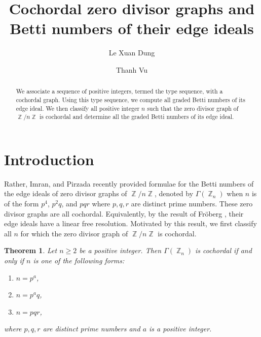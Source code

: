\documentclass[12pt,amscd]{amsart}
\newtheorem{thm}{Theorem}[section]
\theoremstyle{definition}
\numberwithin{equation}{section}
\DeclareMathOperator{\ZZ}{\mathbb {Z}}
\begin{document}
\title{Cochordal zero divisor graphs and Betti numbers of their edge ideals}


\author[L. X. Dung]{Le Xuan Dung}
\address{Department of Algebra and Geometry, Hong Duc University, No. 565 Quang Trung Street, Dong Ve Ward, Thanh Hoa, Vietnam}

\author{Thanh Vu}
\address{Institute of Mathematics, VAST, 18 Hoang Quoc Viet, Hanoi, Vietnam}




\date{}


\commby{}

\begin{abstract}
    We associate a sequence of positive integers, termed the type sequence, with a cochordal graph. Using this type sequence, we compute all graded Betti numbers of its edge ideal. We then classify all positive integer $n$ such that the zero divisor graph of $\ZZ/n \ZZ$ is cochordal and determine all the graded Betti numbers of its edge ideal.
\end{abstract}

\maketitle

\section{Introduction}
\label{sect_intro}

Rather, Imran, and Pirzada \cite{RIP} recently provided formulae for the Betti numbers of the edge ideals of zero divisor graphs of $\ZZ/n\ZZ$, denoted by $\Gamma(\ZZ_n)$ when $n$ is of the form $p^4$, $p^2q$, and $pqr$ where $p,q,r$ are distinct prime numbers. These zero divisor graphs are all cochordal. Equivalently, by the result of Fr\"oberg \cite{F}, their edge ideals have a linear free resolution. Motivated by this result, we first classify all $n$ for which the zero divisor graph of $\ZZ/n\ZZ$ is cochordal. 



\begin{thm}\label{thm_cochordal_zero_div} Let $n \ge 2$ be a positive integer. Then $\Gamma(\ZZ_n)$ is cochordal if and only if $n$ is one of the following forms:
\begin{enumerate}
    \item $n = p^a$,
    \item $n = p^a q$,
    \item $n = p qr$,
\end{enumerate}
where $p,q,r$ are distinct prime numbers and $a$ is a positive integer.
\end{thm}
\end{document}
